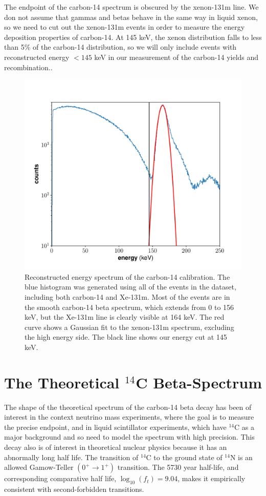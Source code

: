 The endpoint of the carbon-14 spectrum is obscured by the xenon-131m line. We don not assume that gammas and betas behave in the same way in liquid xenon, so we need to cut out the xenon-131m events in order to measure the energy deposition properties of carbon-14. At 145 keV, the xenon distribution falls to less than 5\% of the carbon-14 distribution, so we will only include events with reconstructed energy $<145$ keV in our measurement of the carbon-14 yields and recombination..
\begin{figure}[h!]
\centering
  \includegraphics[width=\textwidth]{Figures/C14_spec_init.pdf}
\caption{Reconstructed energy spectrum of the carbon-14 calibration. The blue histogram was generated using all of the events in the dataset, including both carbon-14 and Xe-131m. Most of the events are in the smooth carbon-14 beta spectrum, which extends from 0 to 156 keV, but the Xe-131m line is clearly visible at 164 keV. The red curve shows a Gaussian fit to the xenon-131m spectrum, excluding the high energy side. The black line shows our energy cut at 145 keV.}
\label{fig:c14Ecut}
\end{figure}



\section{The Theoretical $^{14}$C Beta-Spectrum}
The shape of the theoretical spectrum of the carbon-14 beta decay has been of interest in the context neutrino mass experiments\cite{C14_Wietfeldt}, where the goal is to measure the precise endpoint, and in liquid scintillator experiments, which have $^{14}$C as a major background and so need to model the spectrum with high precision\cite{C14_Borexino, C14_Bergeron}. This  decay also is of interest in theoretical nuclear physics because it has an abnormally long half life\cite{C14_Kuzminov,C14_Genz,C14_Garcia}. The transition of $^{14}$C to the ground state of $^{14}$N is an allowed Gamow-Teller $(0^+ \rightarrow 1^+)$ transition. The 5730 year half-life, and corresponding comparative half life, $\log_{10}(f_t)=9.04$, makes it empirically consistent with second-forbidden transitions.\cite{C14_Kuzminov,C14_Wietfeldt}

